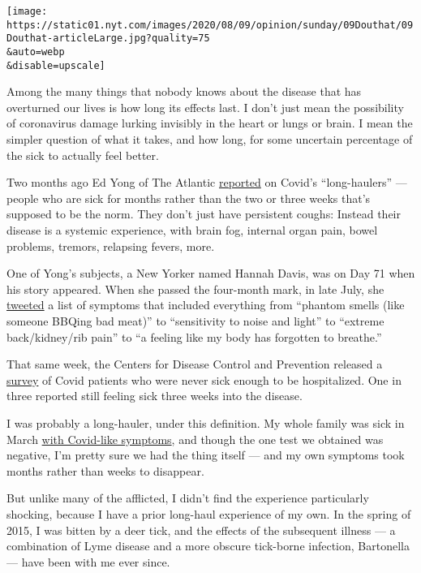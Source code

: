 \texttt{[image: https://static01.nyt.com/images/2020/08/09/opinion/sunday/09Douthat/09Douthat-articleLarge.jpg?quality=75\\\&auto=webp\\\&disable=upscale]}

Among the many things that nobody knows about the disease that has
overturned our lives is how long its effects last. I don't just mean the
possibility of coronavirus damage lurking invisibly in the heart or
lungs or brain. I mean the simpler question of what it takes, and how
long, for some uncertain percentage of the sick to actually feel better.

Two months ago Ed Yong of The Atlantic
\href{https://www.theatlantic.com/health/archive/2020/06/covid-19-coronavirus-longterm-symptoms-months/612679/}{reported}
on Covid's ``long-haulers'' --- people who are sick for months rather
than the two or three weeks that's supposed to be the norm. They don't
just have persistent coughs: Instead their disease is a systemic
experience, with brain fog, internal organ pain, bowel problems,
tremors, relapsing fevers, more.

One of Yong's subjects, a New Yorker named Hannah Davis, was on Day 71
when his story appeared. When she passed the four-month mark, in late
July, she
\href{https://twitter.com/ahandvanish/status/1287525539859910657}{tweeted}
a list of symptoms that included everything from ``phantom smells (like
someone BBQing bad meat)'' to ``sensitivity to noise and light'' to
``extreme back/kidney/rib pain'' to ``a feeling like my body has
forgotten to breathe.''

That same week, the Centers for Disease Control and Prevention released
a
\href{https://www.nbcnews.com/health/health-news/monumental-acknowledgment-cdc-reports-long-term-covid-19-patients-n1234814}{survey}
of Covid patients who were never sick enough to be hospitalized. One in
three reported still feeling sick three weeks into the disease.

I was probably a long-hauler, under this definition. My whole family was
sick in March
\href{https://www.nytimes.com/2020/03/24/opinion/coronavirus-testing.html}{with
Covid-like symptoms}, and though the one test we obtained was negative,
I'm pretty sure we had the thing itself --- and my own symptoms took
months rather than weeks to disappear.

But unlike many of the afflicted, I didn't find the experience
particularly shocking, because I have a prior long-haul experience of my
own. In the spring of 2015, I was bitten by a deer tick, and the effects
of the subsequent illness --- a combination of Lyme disease and a more
obscure tick-borne infection, Bartonella --- have been with me ever
since.

